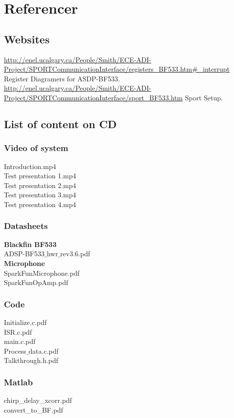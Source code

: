 \chapter{Referencer}
\section{Websites}
\url{http://enel.ucalgary.ca/People/Smith/ECE-ADI-Project/SPORTCommunicationInterface/registers_BF533.htm#_interrupt}
Register Diagramers for ASDP-BF533.\\
\url{http://enel.ucalgary.ca/People/Smith/ECE-ADI-Project/SPORTCommunicationInterface/sport_BF533.htm}
Sport Setup.\\

\section{List of content on CD}
\subsection{Video of system}
Introduction.mp4\\
Test presentation 1.mp4\\
Test presentation 2.mp4\\
Test presentation 3.mp4\\
Test presentation 4.mp4\\


\subsection{Datasheets} 
\textbf{Blackfin BF533}\\
ADSP-BF533$\_$hwr$\_$rev3.6.pdf\\
\textbf{Microphone}\\
SparkFunMicrophone.pdf\\
SparkFunOpAmp.pdf\\


\subsection{Code}
Initialize.c.pdf\\
ISR.c.pdf\\
main.c.pdf\\
Process$\_$data.c.pdf\\
Talkthrough.h.pdf\\

\subsection{Matlab}
chirp\_delay\_xcorr.pdf\\
convert\_to\_BF.pdf\\